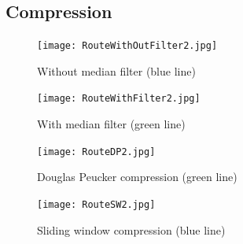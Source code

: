 \subsection{Compression}
\label{app:compression}

\begin{figure}[H]
    \centering
    \texttt{[image: RouteWithOutFilter2.jpg]}
    \caption{Without median filter (blue line)}
    \label{fig:route_without_filter_appendix}
\end{figure}

\begin{figure}[H]
    \centering
    \texttt{[image: RouteWithFilter2.jpg]}
    \caption{With median filter (green line)}
    \label{fig:route_with_filter_appendix}
\end{figure}

\begin{figure}[H]
    \centering
    \texttt{[image: RouteDP2.jpg]}
    \caption{Douglas Peucker compression (green line)}
    \label{fig:douglas_peucker_compression_appendix}
\end{figure}

\begin{figure}[H]
\centering
    \texttt{[image: RouteSW2.jpg]}
    \caption{Sliding window compression (blue line)}
    \label{fig:sliding_window_appendix}
\end{figure}
